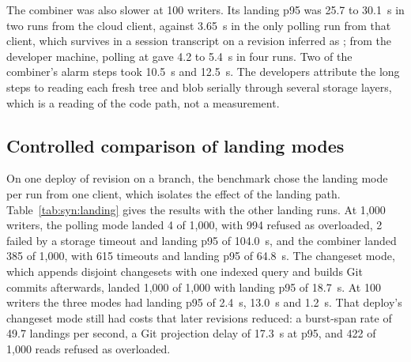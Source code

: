 \documentclass[11pt,letterpaper]{article}
\theoremstyle{definition}
\theoremstyle{remark}
\begin{document}
The combiner was also slower at 100 writers. Its landing p95 was 25.7 to 30.1~s in two runs from the cloud client, against 3.65~s in the only polling run from that client, which survives in a session transcript on a revision inferred as ; from the developer machine, polling at  gave 4.2 to 5.4~s in four runs. %
Two of the combiner's alarm steps took 10.5~s and 12.5~s. The developers attribute the long steps to reading each fresh tree and blob serially through several storage layers, which is a reading of the code path, not a measurement. %

\subsection{Controlled comparison of landing modes}

On one deploy of revision  on a branch, the benchmark chose the landing mode per run from one client, which isolates the effect of the landing path. Table~\ref{tab:syn:landing} gives the results with the other landing runs. At 1,000 writers, the polling mode landed 4 of 1,000, with 994 refused as overloaded, 2 failed by a storage timeout and landing p95 of 104.0~s, and the combiner landed 385 of 1,000, with 615 timeouts and landing p95 of 64.8~s. %
The changeset mode, which appends disjoint changesets with one indexed query and builds Git commits afterwards, landed 1,000 of 1,000 with landing p95 of 18.7~s. %
At 100 writers the three modes had landing p95 of 2.4~s, 13.0~s and 1.2~s. %
That deploy's changeset mode still had costs that later revisions reduced: a burst-span rate of 49.7 landings per second, a Git projection delay of 17.3~s at p95, and 422 of 1,000 reads refused as overloaded. %
\end{document}
